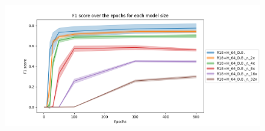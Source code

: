 \begin{figure}[!htbp]
    \centering
    \begin{minipage}[t]{.5\textwidth}%
      \centering
      \includegraphics[width=1\linewidth]{Figures/results/resnet18+head/r18+h_f1_score_over_epochs_reduced_models.png}
      \label{fig:resnet18+head_f1_score_reduced}
    \end{minipage}%
\end{figure}

